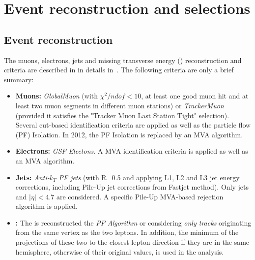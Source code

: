 \section{Event reconstruction and selections\label{sec:Selections}}

	\subsection{Event reconstruction\label{subsec:EventReconstruction}}
The muons, electrons, jets and missing transverse energy (\MET) reconstruction and criteria are described in
in details in~\cite{AN-2012-194}. The following criteria are only a brief summary:
\begin{itemize}
\item {\bf Muons:} {\it GlobalMuon} 
                   (with $\chi^2/ndof < 10$, at least one good muon hit and at least two muon segments in different muon stations)  
                   or {\it TrackerMuon}  (provided it satisfies the "Tracker Muon Last Station Tight" selection). Several cut-based identification 
                   criteria are applied as well as the particle flow (PF) Isolation. In 2012, the PF Isolation is replaced
                   by an MVA algorithm.
\item {\bf Electrons:} {\it GSF Electons}. A MVA identification criteria is applied  as well as an MVA algorithm.
\item {\bf Jets:}  {\it Anti-$k_T$ PF jets} (with R=0.5 and applying L1, L2 and L3 jet energy corrections, including Pile-Up jet corrections from Fastjet method). Only jets and $|\eta|<4.7$ are considered. A specific Pile-Up MVA-based rejection algorithm is applied.   
\item {\bf \MET:}  The \MET is reconstructed the {\it PF Algorithm} or considering {\it only tracks} originating from the same vertex as 
                   the two leptons. In addition, the minimum of the projections of these two \MET to the closest lepton direction if they are in the same hemisphere, otherwise of their original values, is used in the analysis.  
\end{itemize}

